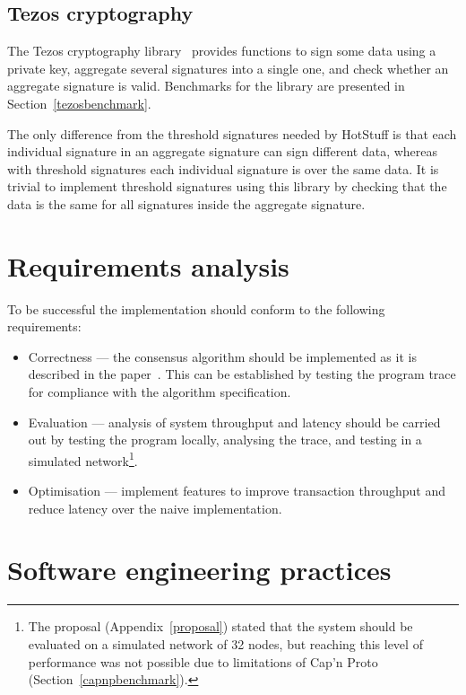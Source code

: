 \subsection{Tezos cryptography} \label{tezos}
The Tezos cryptography library~\cite{tezosCrypto} provides functions to sign some data using a private key, aggregate several signatures into a single one, and check whether an aggregate signature is valid. Benchmarks for the library are presented in Section~\ref{tezosbenchmark}.

The only difference from the threshold signatures needed by HotStuff is that each individual signature in an aggregate signature can sign different data, whereas with threshold signatures each individual signature is over the same data. It is trivial to implement threshold signatures using this library by checking that the data is the same for all signatures inside the aggregate signature.

\section{Requirements analysis} \label{requirements}

To be successful the implementation should conform to the following requirements:
\begin{itemize}
	\item Correctness --- the consensus algorithm should be implemented as it is described in the paper~\cite{yinHotStuffBFTConsensus2019}. This can be established by testing the program trace for compliance with the algorithm specification.
	\item Evaluation --- analysis of system throughput and latency should be carried out by testing the program locally, analysing the trace, and testing in a simulated network\footnote{The proposal (Appendix~\ref{proposal}) stated that the system should be evaluated on a simulated network of 32 nodes, but reaching this level of performance was not possible due to limitations of Cap'n Proto (Section~\ref{capnpbenchmark}).}.
	\item Optimisation --- implement features to improve transaction throughput and reduce latency over the naive implementation.%
\end{itemize}

\section{Software engineering practices} \label{softwareeng}

